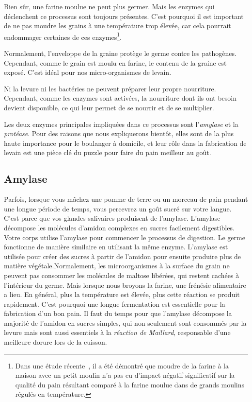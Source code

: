 Bien sûr, une farine moulue ne peut plus germer. Mais les enzymes qui
déclenchent ce processus sont toujours présentes. C'est pourquoi il est important de ne pas
moudre les grains à une température trop élevée, car cela pourrait endommager certaines
de ces enzymes\footnote{Dans une étude récente~\cite{milling+commercial+home+mill+comparison}, il a été démontré que
moudre de la farine
à la maison avec un petit moulin n'a pas eu d'impact négatif significatif sur la qualité du pain résultant comparé à la farine moulue dans de grands moulins régulés en température.}.

Normalement, l'enveloppe de la graine protège le germe contre les pathogènes. Cependant, comme le
grain est moulu en farine, le contenu de la graine est exposé. C'est idéal
pour nos micro-organismes de levain.

Ni la levure ni les bactéries ne peuvent préparer leur propre nourriture. Cependant, comme
les enzymes sont activées, la nourriture dont ils ont besoin devient disponible, ce qui leur permet
de se nourrir et de se multiplier.

Les deux enzymes principales impliquées dans ce processus sont l'\emph{amylase} et
la \emph{protéase}. Pour des raisons que nous expliquerons bientôt, elles sont de la
plus haute importance pour le boulanger à domicile, et leur rôle dans la fabrication de levain
est une pièce clé du puzzle pour faire du pain meilleur au goût.

\subsection{Amylase}

Parfois, lorsque vous mâchez une pomme de terre ou un morceau de pain pendant une longue période
de temps, vous percevrez un goût sucré sur votre langue. C'est parce que vos
glandes salivaires produisent de l'amylase. L'amylase décompose les molécules d'amidon complexes
en sucres facilement digestibles. Votre corps utilise l'amylase pour commencer le processus de digestion. Le germe fonctionne de manière similaire en utilisant la même enzyme. L'amylase
est utilisée pour créer des sucres à partir de l'amidon pour ensuite produire plus de matière végétale.Normalement,
les microorganismes à la surface du grain ne peuvent pas consommer les molécules de maltose libérées,
qui restent cachées à l'intérieur du germe. Mais lorsque nous broyons la farine, une
frénésie alimentaire a lieu. En général, plus la température est élevée, plus
cette réaction se produit rapidement. C'est pourquoi une longue fermentation est essentielle pour la fabrication d'un bon
pain. Il faut du temps pour que l'amylase décompose la majorité de l'amidon en
sucres simples, qui non seulement sont consommés par la levure mais sont aussi essentiels
à la \emph{réaction de Maillard}, responsable d'une meilleure dorure lors de la
cuisson.

